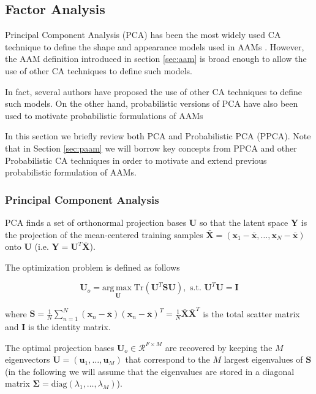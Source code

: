 \subsection{Factor Analysis}
\label{sec:CA}

Principal Component Analysis (PCA) \cite{} has been the most widely used CA technique to define the shape and appearance models used in AAMs \cite{}. However, the AAM definition introduced in section \ref{sec:aam} is broad enough to allow the use of other CA techniques to define such models. 

In fact, several authors have proposed the use of other CA techniques \cite{DelaTorre2008, Hamsici2009,Gonazalez2007} to define such models. On the other hand, probabilistic versions of PCA have also been used to motivate probabilistic formulations of AAMs

In this section we briefly review both PCA and Probabilistic PCA (PPCA). Note that in Section \ref{sec:paam} we will borrow key concepts from PPCA and other Probabilistic CA techniques in order to motivate and extend previous probabilistic formulation of AAMs.


\subsubsection{Principal Component Analysis}
\label{sec:PCA}

PCA finds a set of orthonormal projection bases $\mathbf{U}$ so that the latent space $\mathbf{Y}$ is the projection of the mean-centered training samples $\mathbf{\bar{X}} = \left( \mathbf{x}_1 - \bar{\mathbf{x}}, \ldots, \mathbf{x}_N - \bar{\mathbf{x}} \right)$ onto $\mathbf{U}$ (i.e. $\mathbf{Y} = \mathbf{U}^T \mathbf{\bar{X}}$). 

The optimization problem is defined as follows

\begin{equation}
	\mathbf{U}_o = \underset{\mathbf{U}}{\mathrm{arg\,max\;}} \mathrm{Tr} \left( \mathbf{U}^T \mathbf{S} \mathbf{U} \right), \,\, \mbox{s.t.} \,\, \mathbf{U}^T\mathbf{U} = \mathbf{I}
\end{equation}

where $\mathbf{S} = \frac{1}{N} \sum_{n=1}^N (\mathbf{x}_n - \bar{\mathbf{x}})(\mathbf{x}_n - \bar{\mathbf{x}})^T = \frac{1}{N} \mathbf{\bar{X}} \mathbf{\bar{X}}^T$ is the total scatter matrix and $\mathbf{I}$ is the identity matrix. 

The optimal projection bases $\mathbf{U}_o \in \mathcal{R}^{F \times M}$ are recovered by keeping the $M$ eigenvectors $\mathbf{U} = (\mathbf{u}_1, \ldots ,\mathbf{u}_M)$ that correspond to the $M$ largest eigenvalues of $\mathbf{S}$ (in the following we will assume that the eigenvalues are stored in a diagonal matrix $\mathbf{\Sigma}= \textrm{diag} \left( \lambda_1, \ldots, \lambda_M \right)$).

